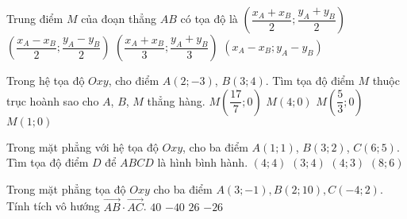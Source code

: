\begin{ex}
	Trung điểm $M$ của đoạn thẳng $AB$ có tọa độ là
	\choice
	{\True $\left(\dfrac{x_A+x_B}{2};\dfrac{y_A+y_B}{2}\right)$}
	{$\left(\dfrac{x_A-x_B}{2};\dfrac{y_A-y_B}{2}\right)$}
	{$\left(\dfrac{x_A+x_B}{3};\dfrac{y_A+y_B}{3}\right)$}
	{\True $(x_A-x_B;y_A-y_B)$}
\end{ex}

\begin{ex}%
	Trong hệ tọa độ $Oxy$, cho điểm $A(2;-3)$, $B(3;4)$. Tìm tọa độ điểm $M$ thuộc trục hoành sao cho $A$, $B$, $M$ thẳng hàng.
	\choice
	{\True $M\left(\dfrac{17}{7}; 0\right)$}
	{$M(4; 0)$}
	{$M\left(\dfrac{5}{3}; 0\right)$}
	{$M(1; 0)$}
\end{ex}

\begin{ex}%
	Trong mặt phẳng với hệ tọa độ $Oxy$, cho ba điểm $A(1;1)$, $B(3;2)$, $C(6;5)$. Tìm tọa độ điểm $D$ để $ABCD$ là hình bình hành.
	\choice
	{\True $(4;4)$}
	{$(3;4)$}
	{$(4;3)$}
	{$(8;6)$}
\end{ex}

\begin{ex}%
	Trong mặt phẳng tọa độ $Oxy$ cho ba điểm $A\left( 3;-1 \right),B\left( 2;10 \right),C\left( -4;2 \right)$. Tính tích vô hướng $\overrightarrow{AB}\cdot \overrightarrow{AC}$.
	\choice
	{\True $40$}
	{$-40$}
	{$26$}
	{$-26$}
\end{ex}

